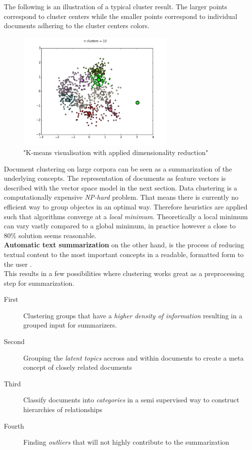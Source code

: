   The following is an illustration of a typical cluster result. The larger points correspond to cluster centers while the smaller points correspond to individual documents adhering to the cluster centers colors. 

  \begin{figure}[h!]
    \centering
      \includegraphics[width=0.7\textwidth]{clustering_intro.png}
      \caption{"K-means visualisation with applied dimensionality reduction"}
      \label{clustering_intro}
  \end{figure}

  Document clustering on large corpora can be seen as a summarization of the underlying concepts. The representation of documents as feature vectors is described with the vector space model in the next section. Data clustering is a computationally expensive \emph{NP-hard} problem. That means there is currently no efficient way to group objectcs in an optimal way. Therefore heuristics are applied such that algorithms converge at a  \emph{local minimum}. Theoretically a local minimum can vary vastly compared to a global minimum, in practice however a close to 80\% solution seems reasonable.\\
  \textbf{Automatic text summarization} on the other hand, is the process of reducing textual content to the most important concepts in a readable, formatted form to the user \cite{SumEvaluation2001}.\\
  This results in a few possibilities where clustering works great as a preprocessing step for summarization.
  
  \begin{description}
    \item[First] Clustering groups that have a \emph{higher density of information} resulting in a grouped input for summarizers.
    \item[Second] Grouping the \emph{latent topics} accross and within documents to create a meta concept of closely related documents
    \item[Third] Classify documents into \emph{categories} in a semi supervised way to construct hierarchies of relationships
    \item[Fourth] Finding \emph{outliers} that will not highly contribute to the summarization
  \end{description}

